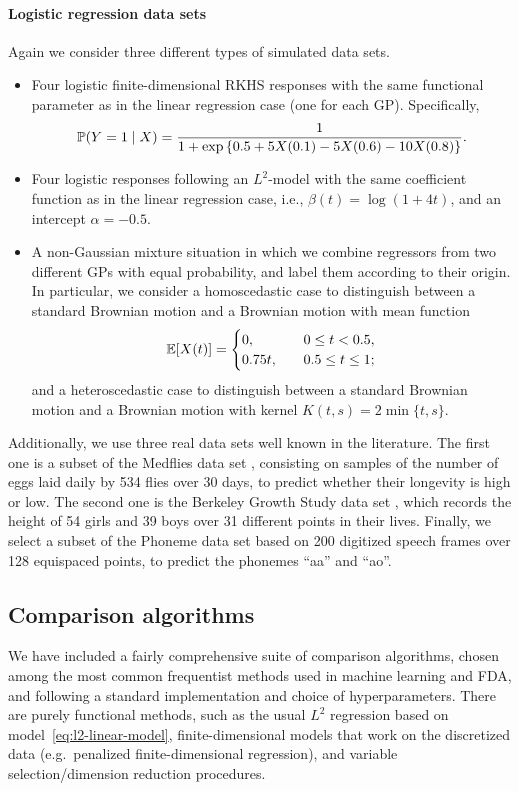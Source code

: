 \paragraph{Logistic regression data sets} Again we consider three different types of simulated data sets.
\begin{itemize}
  \item Four logistic finite-dimensional \acs{RKHS} responses with the same functional parameter as in the linear regression case (one for each \acs{GP}). Specifically,
  \[
    \mathbb{P}(Y=1\mid X) = \frac{1}{1 + \exp\left\{0.5 +5X(0.1) - 5X(0.6) - 10X(0.8)\right\}}.
  \]
  \item Four logistic responses following an \(L^2\)-model with the same coefficient function as in the linear regression case, i.e., \(\beta(t)=\log(1+4t)\), and an intercept \(\alpha=-0.5\).
  \item A non-Gaussian mixture situation in which we combine regressors from two different \acs{GPs} with equal probability, and label them according to their origin. In particular, we consider a homoscedastic case to distinguish between a standard Brownian motion and a Brownian motion with mean function
  \[
  \mathbb{E}[X(t)] = \begin{cases}
    0,& \quad 0 \leq t < 0.5,\\
    0.75t,&\quad 0.5\leq t \leq 1;
  \end{cases}
  \]
  and a heteroscedastic case to distinguish between a standard Brownian motion and a Brownian motion with kernel \(K(t,s)=2\min\{t,s\}\).
\end{itemize}
Additionally, we use three real data sets well known in the literature. The first one is a subset of the Medflies data set \citep{carey1998relationship}, consisting on samples of the number of eggs laid daily by 534 flies over 30 days, to predict whether their longevity is high or low. The second one is the Berkeley Growth Study data set \citep{tuddenham1954physical}, which records the height of 54 girls and 39 boys over 31 different points in their lives. Finally, we select a subset of the Phoneme data set \citep{hastie1995penalized} based on 200 digitized speech frames over 128 equispaced points, to predict the phonemes ``aa'' and ``ao''.

\subsection{Comparison algorithms}

We have included a fairly comprehensive suite of comparison algorithms, chosen among the most common frequentist methods used in machine learning and \acs{FDA}, and following a standard implementation and choice of hyperparameters. There are purely functional methods, such as the usual \(L^2\) regression based on model~\eqref{eq:l2-linear-model}, finite-dimensional models that work on the discretized data (e.g.\ penalized finite-dimensional regression), and variable selection/dimension reduction procedures.

